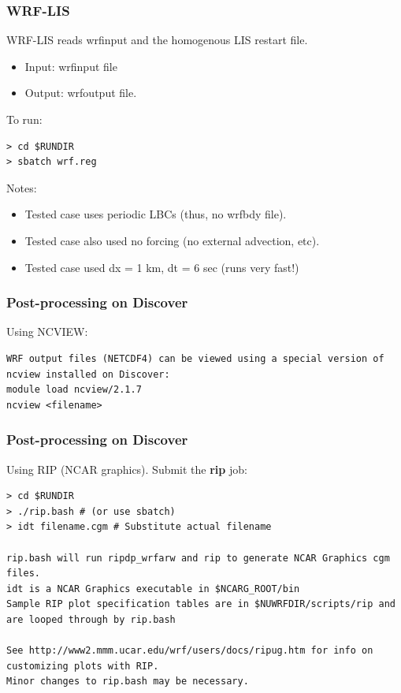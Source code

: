 \begin{frame}[fragile]\frametitle{WRF-LIS}

\footnotesize{
WRF-LIS reads wrfinput and the homogenous LIS restart file.
\begin{itemize}
\item Input: wrfinput file
\item Output: wrfoutput file.
\end{itemize}
}    
\hrulefill\par
\footnotesize{To run:}
\begin{lstlisting}
> cd $RUNDIR
> sbatch wrf.reg
\end{lstlisting}
\footnotesize{
\hrulefill\par       
Notes:
\begin{itemize}
\item Tested case uses periodic LBCs (thus, no wrfbdy file).
\item Tested case also used no forcing (no external advection, etc).
\item Tested case used dx = 1 km, dt = 6 sec (runs very fast!)
\end{itemize}
}    

\end{frame}

\begin{frame}[fragile]
\frametitle{Post-processing on Discover}

Using NCVIEW:

\begin{lstlisting}
WRF output files (NETCDF4) can be viewed using a special version of ncview installed on Discover:
module load ncview/2.1.7
ncview <filename>
\end{lstlisting}

\end{frame}

\begin{frame}[fragile]
\frametitle{Post-processing on Discover}

Using RIP (NCAR graphics). Submit the \textbf{rip} job:
\begin{lstlisting}
> cd $RUNDIR
> ./rip.bash # (or use sbatch)
> idt filename.cgm # Substitute actual filename

rip.bash will run ripdp_wrfarw and rip to generate NCAR Graphics cgm files.
idt is a NCAR Graphics executable in $NCARG_ROOT/bin
Sample RIP plot specification tables are in $NUWRFDIR/scripts/rip and are looped through by rip.bash

See http://www2.mmm.ucar.edu/wrf/users/docs/ripug.htm for info on customizing plots with RIP. 
Minor changes to rip.bash may be necessary.
\end{lstlisting}

\end{frame}





